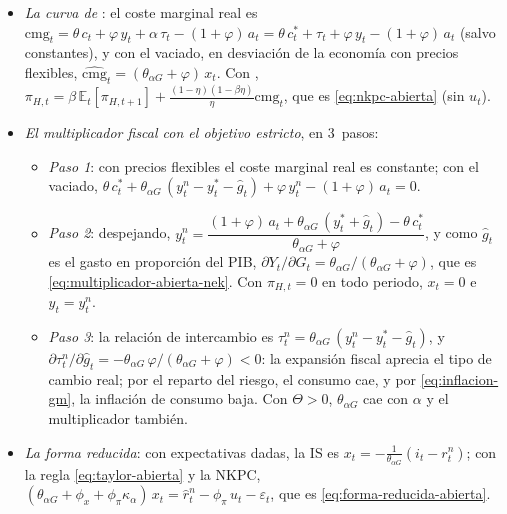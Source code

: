 \documentclass[11pt]{article}
\begin{document}
\begin{itemize}
\begin{itemize}
\begin{equation*}
  \end{equation*}
  Restando la misma ecuación con precios flexibles ($y^n_t$) sale \eqref{eq:is-abierta-gm}, con $r^n_t=\rho+\theta_{\alpha G}\big(\mathbb{E}_t[\Delta y^n_{t+1}]+\alpha\,\Theta\,\mathbb{E}_t[\Delta y^*_{t+1}]-\mathbb{E}_t[\Delta\hat g_{t+1}]\big)$.
  \item \emph{La curva de }: el coste marginal real es $\mathrm{cmg}_t=\theta\,c_t+\varphi\,y_t+\alpha\,\tau_t-(1+\varphi)\,a_t=\theta\,c^*_t+\tau_t+\varphi\,y_t-(1+\varphi)\,a_t$ (salvo constantes), y con el vaciado, en desviación de la economía con precios flexibles, $\widehat{\mathrm{cmg}}_t=(\theta_{\alpha G}+\varphi)\,x_t$. Con , $\pi_{H,t}=\beta\,\mathbb{E}_t[\pi_{H,t+1}]+\frac{(1-\eta)(1-\beta\eta)}{\eta}\widehat{\mathrm{cmg}}_t$, que es \eqref{eq:nkpc-abierta} (sin $u_t$).
  \item \emph{El multiplicador fiscal con el objetivo estricto}, en 3~pasos\nocite{Furlanetto2006Fiscal}:
    \begin{itemize}
    \item \emph{Paso 1}: con precios flexibles el coste marginal real es constante; con el vaciado, $\theta\,c^*_t+\theta_{\alpha G}\,(y^n_t-y^*_t-\hat g_t)+\varphi\,y^n_t-(1+\varphi)\,a_t=0$.
    \item \emph{Paso 2}: despejando, $y^n_t=\dfrac{(1+\varphi)\,a_t+\theta_{\alpha G}\,(y^*_t+\hat g_t)-\theta\,c^*_t}{\theta_{\alpha G}+\varphi}$, y como $\hat g_t$ es el gasto en proporción del PIB, $\partial Y_t/\partial G_t=\theta_{\alpha G}/(\theta_{\alpha G}+\varphi)$, que es \eqref{eq:multiplicador-abierta-nek}. Con $\pi_{H,t}=0$ en todo periodo, $x_t=0$ e $y_t=y^n_t$.
    \item \emph{Paso 3}: la relación de intercambio es $\tau^n_t=\theta_{\alpha G}\,(y^n_t-y^*_t-\hat g_t)$, y $\partial\tau^n_t/\partial\hat g_t=-\theta_{\alpha G}\,\varphi/(\theta_{\alpha G}+\varphi)<0$: la expansión fiscal aprecia el tipo de cambio real; por el reparto del riesgo, el consumo cae, y por \eqref{eq:inflacion-gm}, la inflación de consumo baja. Con $\Theta>0$, $\theta_{\alpha G}$ cae con $\alpha$ y el multiplicador también.
    \end{itemize}
  \item \emph{La forma reducida}: con expectativas dadas, la IS es $x_t=-\frac{1}{\theta_{\alpha G}}(i_t-r^n_t)$; con la regla \eqref{eq:taylor-abierta} y la NKPC, $(\theta_{\alpha G}+\phi_x+\phi_\pi\kappa_\alpha)\,x_t=\hat r^n_t-\phi_\pi\,u_t-\varepsilon_t$, que es \eqref{eq:forma-reducida-abierta}.

\end{itemize}
\end{itemize}
\end{document}
